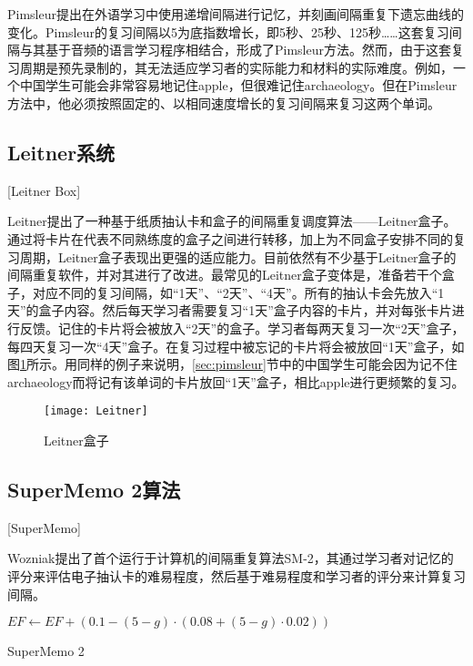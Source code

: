 Pimsleur提出在外语学习中使用递增间隔进行记忆，并刻画间隔重复下遗忘曲线的变化\cite{pimsleurMemorySchedule1967}。Pimsleur的复习间隔以5为底指数增长，即5秒、25秒、125秒……这套复习间隔与其基于音频的语言学习程序相结合，形成了Pimsleur方法。然而，由于这套复习周期是预先录制的，其无法适应学习者的实际能力和材料的实际难度。例如，一个中国学生可能会非常容易地记住apple，但很难记住archaeology。但在Pimsleur方法中，他必须按照固定的、以相同速度增长的复习间隔来复习这两个单词。

\subsection{Leitner系统}[Leitner Box]

Leitner提出了一种基于纸质抽认卡和盒子的间隔重复调度算法——Leitner盒子\cite{leitnerLerntManLeben1974}。通过将卡片在代表不同熟练度的盒子之间进行转移，加上为不同盒子安排不同的复习周期，Leitner盒子表现出更强的适应能力。目前依然有不少基于Leitner盒子的间隔重复软件，并对其进行了改进。最常见的Leitner盒子变体是，准备若干个盒子，对应不同的复习间隔，如“1天”、“2天”、“4天”。所有的抽认卡会先放入“1天”的盒子内容。然后每天学习者需要复习“1天”盒子内容的卡片，并对每张卡片进行反馈。记住的卡片将会被放入“2天”的盒子。学习者每两天复习一次“2天”盒子，每四天复习一次“4天”盒子。在复习过程中被忘记的卡片将会被放回“1天”盒子，如图\ref{fig:leitner}所示。用同样的例子来说明，\ref{sec:pimsleur}节中的中国学生可能会因为记不住archaeology而将记有该单词的卡片放回“1天”盒子，相比apple进行更频繁的复习。

\begin{figure}[htbp]
    \centering
    \texttt{[image: Leitner]}
    \caption{Leitner盒子}
    \label{fig:leitner}
\end{figure}

\subsection{SuperMemo 2算法}[SuperMemo]

Wozniak提出了首个运行于计算机的间隔重复算法SM-2\cite{wozniakOptimizationLearning1990}，其通过学习者对记忆的评分来评估电子抽认卡的难易程度，然后基于难易程度和学习者的评分来计算复习间隔。

\begin{algorithm}[htbp]
    $EF \leftarrow  EF + (0.1-(5-g)\cdot(0.08+(5-g)\cdot0.02))$\;
\caption{SuperMemo 2}
\label{alg:sm-2}
\end{algorithm}

